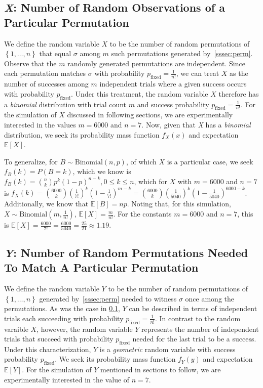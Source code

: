 \documentclass[11pt, oneside]{article}   	%
\begin{document}
\subsection{\textit{X}: Number of Random Observations of a Particular Permutation}\label{ssec:x}
We define the random variable $X$ to be the number of random permutations of $\left\{1, \dots, n\right\}$ that equal $\sigma$ among $m$ such permutations generated by~\ref{sssec:perm}. Observe that the $m$ randomly generated permutations are independent. Since each permutation matches $\sigma$ with probability $p_{\text{fixed}} = \frac{1}{n!}$, we can treat $X$ as the number of successes among $m$ independent trials where a given success occurs with probability $p_{\text{fixed}}$. Under this treatment, the random variable $X$ therefore has a \textit{binomial} distribution with trial count $m$ and success probability $p_{\text{fixed}} = \frac{1}{n!}$. For the simulation of $X$ discussed in following sections, we are experimentally interested in the values $m = 6000$ and $n = 7$. Now, given that \textit{X} has a \textit{binomial} distribution, we seek its probability mass function $f_X(x)$ and expectation $\mathbb{E}[X]$.

To generalize, for $B \sim \text{Binomial}(n, p)$, of which $X$ is a particular case, we seek $f_B(k) = P(B = k)$, which we know is $f_B(k) = {n \choose k}p^k(1-p)^{n-k}, 0 \leq k \leq n$, which for $X$ with $m = 6000$ and $n = 7$ is $f_X(k) = {6000 \choose k}(\frac{1}{7!})^k(1-\frac{1}{7!})^{m-k} = {6000 \choose k}(\frac{1}{5040})^k(1-\frac{1}{5040})^{6000-k}$. Additionally, we know that $\mathbb{E}[B] = np$. Noting that, for this simulation, $X \sim \text{Binomial}(m,\frac{1}{n!})$, $\mathbb{E}[X] = \frac{m}{n!}$. For the constants $m = 6000$ and $n = 7$, this is $\mathbb{E}[X] = \frac{6000}{7!} = \frac{6000}{5040} = \frac{25}{21} \approx 1.19$.

\subsection{\textit{Y}: Number of Random Permutations Needed To Match A Particular Permutation}
We define the random variable $Y$ to be the number of random permutations of $\left\{1, \dots, n\right\}$ generated by~\ref{sssec:perm} needed to witness $\sigma$ once among the permutations. As was the case in \ref{ssec:x}, $Y$ can be described in terms of independent trials each succeeding with probability $p_{\text{fixed}} = \frac{1}{n!}$. In contrast to the random varaible $X$, however, the random variable $Y$ represents the number of independent trials that succeed with probability $p_{\text{fixed}}$ needed for the last trial to be a success. Under this characterization, $Y$ is a \textit{geometric} random variable with success probability $p_{\text{fixed}}$. We seek its probability mass function $f_Y(y)$ and expectation $\mathbb{E}[Y]$. For the simulation of $Y$ mentioned in sections to follow, we are experimentally interested in the value of $n = 7$.
\end{document}
